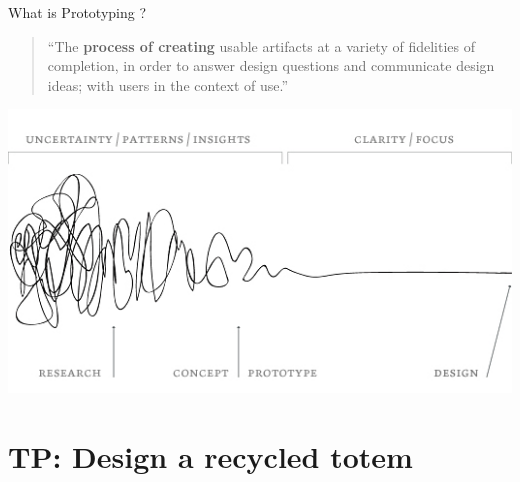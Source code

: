 \documentclass[
  ignorenonframetext,
  aspectratio=169,
  c]{beamer}
\begin{document}
\begin{frame}{What is Prototyping ?}
\begin{quote}
``The \textbf{process of creating} usable artifacts at a variety of
fidelities of completion, in order to answer design questions and
communicate design ideas; with users in the context of use.''
\end{quote}

\begin{center}
\includegraphics{figures/process-explained-1.jpg}
\end{center}
\end{frame}

\section{TP: Design a recycled totem}\label{tp-design-a-recycled-totem}
\end{document}
